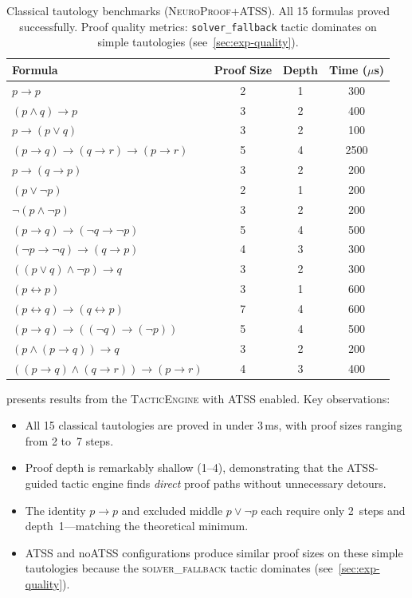 \documentclass[conference]{IEEEtran}
\newcommand{\NP}{\textsc{NeuroProof}}
\newcommand{\ATSS}{\textsc{ATSS}}
\begin{document}
\begin{table}[t]
  \centering
  \caption{Classical tautology benchmarks (\NP{}+\ATSS{}).
   All 15 formulas proved successfully.
   Proof quality metrics: \texttt{solver\_fallback} tactic
   dominates on simple tautologies (see~\cref{sec:exp-quality}).}
  \label{tab:tautologies}
  \begin{tabular}{@{}lccc@{}}
    \toprule
    Formula & \multicolumn{1}{c}{Proof Size}
            & \multicolumn{1}{c}{Depth}
            & Time ($\mu$s) \\
    \midrule
    $p \to p$
      & 2 & 1 & 300 \\
    $(p \wedge q) \to p$
      & 3 & 2 & 400 \\
    $p \to (p \vee q)$
      & 3 & 2 & 100 \\
    $(p \to q) \to (q \to r) \to (p \to r)$
      & 5 & 4 & 2500 \\
    $p \to (q \to p)$
      & 3 & 2 & 200 \\
    $(p \vee \neg p)$
      & 2 & 1 & 200 \\
    $\neg(p \wedge \neg p)$
      & 3 & 2 & 200 \\
    $(p \to q) \to (\neg q \to \neg p)$
      & 5 & 4 & 500 \\
    $(\neg p \to \neg q) \to (q \to p)$
      & 4 & 3 & 300 \\
    $((p \vee q) \wedge \neg p) \to q$
      & 3 & 2 & 300 \\
    $(p \leftrightarrow p)$
      & 3 & 1 & 600 \\
    $(p \leftrightarrow q) \to (q \leftrightarrow p)$
      & 7 & 4 & 600 \\
    $(p \to q) \to ((\neg q) \to (\neg p))$
      & 5 & 4 & 500 \\
    $(p \wedge (p \to q)) \to q$
      & 3 & 2 & 200 \\
    $((p \to q) \wedge (q \to r)) \to (p \to r)$
      & 4 & 3 & 400 \\
    \bottomrule
  \end{tabular}
\end{table}

 presents results from the \textsc{TacticEngine}
with \ATSS{} enabled.  Key observations:
\begin{itemize}
  \item All 15 classical tautologies are proved in under
    $3$\,ms, with proof sizes ranging from 2 to~7 steps.
  \item Proof depth is remarkably shallow (1--4), demonstrating
    that the ATSS-guided tactic engine finds \emph{direct} proof
    paths without unnecessary detours.
  \item The identity $p \to p$ and excluded middle $p \vee \neg p$
    each require only 2~steps and depth~1---matching the
    theoretical minimum.
  \item ATSS and noATSS configurations produce similar proof sizes
    on these simple tautologies because the \textsc{solver\_fallback}
    tactic dominates (see~\cref{sec:exp-quality}).
\end{itemize}
\end{document}
